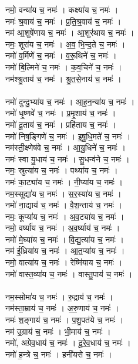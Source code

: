 नमो॒ वन्या॑य च॒ नमः॑ । कक्ष्या॑य च॒ नमः॑ ।\\
नमः॑ श्र॒वाय॑ च॒ नमः॑ । प्र॒ति॒श्र॒वाय॑ च॒ नमः॑ ।\\
नम॑ आ॒शुषे॑णाय च॒ नमः॑ । आ॒शुर॑थाय च॒ नमः॑ ।\\
नमः॒ शूरा॑य च॒ नमः॑ । अ॒व॒ भि॒न्द॒ते च॒ नमः॑ ।\\
नमो॑ व॒र्मिणे॑ च॒ नमः॑ । व॒रू॒थिने॑ च॒ नमः॑ ।\\
नमो॑ बि॒ल्मिने॑ च॒ नमः॑ । क॒व॒चिने॑ च॒ नमः॑ ।\\
नम॑श्श्रु॒ताय॑ च॒ नमः॑ । श्रु॒त॒से॒नाय॑ च॒ नमः॑ ।\\
\\
नमो॑ दुन्दु॒भ्या॑य च॒ नमः॑ । आ॒ह॒न॒न्या॑य च॒ नमः॑ ।\\
नमो॑ धृ॒ष्णवे॑ च॒ नमः॑ । प्र॒मृ॒शाय॑ च॒ नमः॑ ।\\
नमो॑ दू॒ताय॑ च॒ नमः॑ । प्रहि॑ताय च॒ नमः॑ ।\\
नमो॑ निष॒ङ्गिणे॑ च॒ नमः॑ । इ॒षु॒धि॒मते॑ च॒ नमः॑ ।\\
नम॑स्ती॒क्ष्णेष॑वे च॒ नमः॑ । आ॒यु॒धिने॑ च॒ नमः॑ ।\\
नमः॑ स्वा यु॒धाय॑ च॒ नमः॑ । सु॒धन्व॑ने च॒ नमः॑ ।\\
नमः॒ स्रुत्या॑य च॒ नमः॑ । पथ्या॑य च॒ नमः॑ ।\\
नमः॑ का॒ट्या॑य च॒ नमः॑ । नी॒प्या॑य च॒ नमः॑ ।\\
नम॒स्सूद्या॑य च॒ नमः॑ । स॒र॒स्या॑य च॒ नमः॑ ।\\
नमो॑ ना॒द्याय॑ च॒ नमः॑ । वै॒श॒न्ताय॑ च॒ नमः॑ ।\\
नमः॒ कूप्या॑य च॒ नमः॑ । अ॒व॒ट्या॑य च॒ नमः॑ ।\\
नमो॒ वर्ष्या॑य च॒ नमः॑ । अ॒व॒र्ष्याय॑ च॒ नमः॑ ।\\
नमो॑ मे॒घ्या॑य च॒ नमः॑ । वि॒द्यु॒त्या॑य च॒ नमः॑ ।\\
नम॑ ई॒ध्रिया॑य च॒ नमः॑ । आ॒त॒प्या॑य च॒ नमः॑ ।\\
नमो॒ वात्या॑य च॒ नमः॑ । रेष्मि॑याय च॒ नमः॑ ।\\
नमो॑ वास्त॒व्या॑य च॒ नमः॑ । वास्तु॒पाय॑ च॒ नमः॑ ।\\
\\
नम॒स्सोमा॑य च॒ नमः॑ । रु॒द्राय॑ च॒ नमः॑ ।\\
नम॑स्ता॒म्राय॑ च॒ नमः॑ । अ॒रु॒णाय॑ च॒ नमः॑ ।\\
नमः॑ श॒ङ्गाय॑ च॒ नमः॑ । प॒शु॒पत॑ये च॒ नमः॑ ।\\
नम॑ उ॒ग्राय॑ च॒ नमः॑ । भी॒माय॑ च॒ नमः॑ ।\\
नमो॑, अग्रेव॒धाय॑ च॒ नमः॑ । दू॒रे॒व॒धाय॑ च॒ नमः॑ ।\\
नमो॑ ह॒न्त्रे च॒ नमः॑ । हनी॑यसे च॒ नमः॑ ।\\

